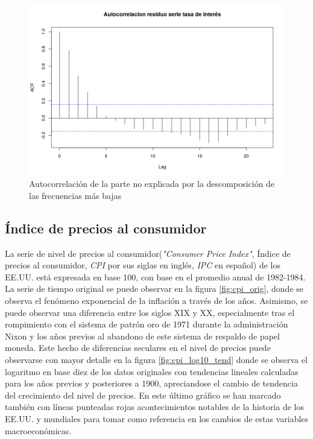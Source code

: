 \documentclass[a4paper]{article}
\begin{document}
\begin{figure}[H]
	\centering
	\includegraphics[width=0.8\linewidth]{ir_resid_acf.png}
	\caption{Autocorrelación de la parte no explicada por la descomposición de las frecuencias más bajas} 	
	\label{fig:ir_resid_acf}
\end{figure}

\subsection{Índice de precios al consumidor}
La serie de nivel de precios al consumidor(\textit{"Consumer Price Index"}, Índice de precios al consumidor, \textit{CPI} por sus siglas en inglés, \textit{IPC} en español) de los EE.UU. está expresada en base 100, con base en el promedio anual de 1982-1984. La serie de tiempo original se puede observar en la figura \ref{fig:cpi_orig}, donde se observa el fenómeno exponencial de la inflación a través de los años. Asimismo, se puede observar una diferencia entre los siglos XIX y XX, especialmente tras el rompimiento con el sistema de patrón oro de 1971 durante la administración Nixon y los años previos al abandono de este sistema de respaldo de papel moneda. Este hecho de diferencias seculares en el nivel de precios puede observarse con mayor detalle en la figura \ref{fig:cpi_log10_tend} donde se observa el logaritmo en base diez de los datos originales con tendencias lineales calculadas para los años previos y posteriores a 1900, apreciandose el cambio de tendencia del crecimiento del nivel de precios. En este último gráfico se han marcado también con líneas punteadas rojas acontecimientos notables de la historia de los EE.UU. y mundiales para tomar como referencia en los cambios de estas variables macroeconómicas.
\end{document}
